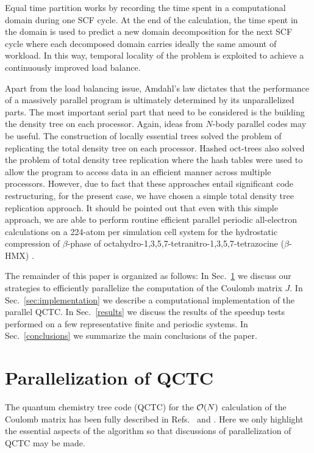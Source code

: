 \commentoutA{\documentclass[prl,aps,twocolumn,twocolumngrid,superbib]{revtex4}}
\begin{document}
Equal time partition works by recording the time spent in a
computational domain during one SCF cycle. At the end of the
calculation, the time spent in the domain is used to predict a new
domain decomposition for the next SCF cycle where each decomposed
domain carries ideally the same amount of workload.  In this way,
temporal locality\cite{JPilkington96} of the problem is exploited to
achieve a continuously improved load balance.

Apart from the load balancing issue, Amdahl's law dictates that the
performance of a massively parallel program is ultimately determined
by its unparallelized parts.  The most important serial part that need
to be considered is the building the density tree on each processor.
Again, ideas from $N$-body parallel codes may be useful.  The
construction of locally essential trees\cite{MWarren92} solved the
problem of replicating the total density tree on each processor.
Hashed oct-trees\cite{MWarren93,MWarren95b} also solved the problem of
total density tree replication where the hash tables were used to
allow the program to access data in an efficient manner across
multiple processors. However, due to fact that these approaches entail
significant code restructuring, for the present case, we have chosen a
simple total density tree replication approach.  It should be pointed
out that even with this simple approach, we are able to perform
routine efficient parallel periodic all-electron calculations on a
224-atom per simulation cell system for the hydrostatic compression of
$\beta$-phase of octahydro-1,3,5,7-tetranitro-1,3,5,7-tetrazocine
($\beta$-HMX)
\cite{CGan04C}.

The remainder of this paper is organized as follows: In
Sec.~\ref{ParaQCTC} we discuss our strategies to efficiently
parallelize the computation of the Coulomb matrix $J$. In
Sec.~\ref{sec:implementation} we describe a computational
implementation of the parallel QCTC. In Sec.~\ref{results} we discuss
the results of the speedup tests performed on a few representative
finite and periodic systems. In Sec.~\ref{conclusions} we summarize
the main conclusions of the paper.

\section{Parallelization of QCTC}
\label{ParaQCTC}
The quantum chemistry tree code (QCTC) for the ${\cal O}(N)$
calculation of the Coulomb matrix has been fully described in
Refs.~ and .  Here
we only highlight the essential aspects of the algorithm so that
discussions of parallelization of QCTC may be made.
\end{document}
